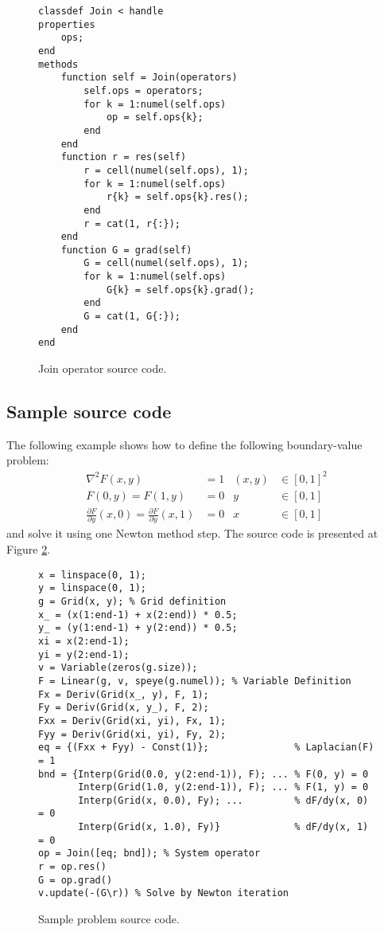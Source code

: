 \documentclass[MSc,beforeExam]{iitcsthesis}
\newcommand{\deriv}[2]{\frac{\partial #1}{\partial #2}}
\newcommand\Laplacian{\nabla^2}
\begin{document}
\begin{figure}[htpb]
\begin{lstlisting}
classdef Join < handle
properties
    ops;
end
methods
    function self = Join(operators)
        self.ops = operators;
        for k = 1:numel(self.ops)
        	op = self.ops{k}; 
        end
    end
    function r = res(self)
        r = cell(numel(self.ops), 1);
        for k = 1:numel(self.ops)
            r{k} = self.ops{k}.res();
        end
        r = cat(1, r{:});
    end
    function G = grad(self) 
        G = cell(numel(self.ops), 1);
        for k = 1:numel(self.ops)
            G{k} = self.ops{k}.grad();
        end
        G = cat(1, G{:});
    end
end
\end{lstlisting}
\caption{Join operator source code.} \label{fig:join.m}
\end{figure}

\subsection{Sample source code}
The following example shows how to define the following boundary-value problem:
\begin{align}
\Laplacian F(x,y) &= 1 & (x,y) &\in [0,1]^2 \\
F(0, y) = F(1, y) &= 0 & y &\in [0,1] \\
\deriv{F}{y}(x, 0) = \deriv{F}{y}(x, 1) &= 0 & x &\in [0,1]
\end{align}
and solve it using one Newton method step.
The source code is presented at Figure \ref{fig:sample.m}.
\begin{figure}[htpb]
\begin{lstlisting}
x = linspace(0, 1); 
y = linspace(0, 1);
g = Grid(x, y); % Grid definition
x_ = (x(1:end-1) + x(2:end)) * 0.5;
y_ = (y(1:end-1) + y(2:end)) * 0.5;
xi = x(2:end-1);
yi = y(2:end-1);
v = Variable(zeros(g.size)); 
F = Linear(g, v, speye(g.numel)); % Variable Definition
Fx = Deriv(Grid(x_, y), F, 1);
Fy = Deriv(Grid(x, y_), F, 2);
Fxx = Deriv(Grid(xi, yi), Fx, 1);
Fyy = Deriv(Grid(xi, yi), Fy, 2);
eq = {(Fxx + Fyy) - Const(1)};               % Laplacian(F) = 1
bnd = {Interp(Grid(0.0, y(2:end-1)), F); ... % F(0, y) = 0
	   Interp(Grid(1.0, y(2:end-1)), F); ... % F(1, y) = 0
       Interp(Grid(x, 0.0), Fy); ...         % dF/dy(x, 0) = 0
       Interp(Grid(x, 1.0), Fy)}		     % dF/dy(x, 1) = 0       
op = Join([eq; bnd]); % System operator
r = op.res()
G = op.grad()
v.update(-(G\r)) % Solve by Newton iteration
\end{lstlisting}
\caption{Sample problem source code.} \label{fig:sample.m}
\end{figure}
\end{document}
